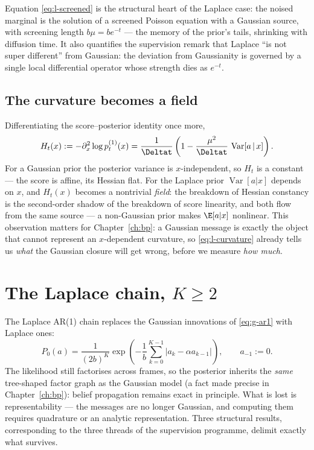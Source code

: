 Equation \eqref{eq:l-screened} is the structural heart of the Laplace case:
the noised marginal is the solution of a screened Poisson equation with a
Gaussian source, with screening length $b\mu = b e^{-t}$ --- the memory of
the prior's tails, shrinking with diffusion time. It also quantifies the
supervision remark that Laplace ``is not super different'' from Gaussian:
the deviation from Gaussianity is governed by a single local differential
operator whose strength dies as $e^{-t}$.

\subsection{The curvature becomes a field}

Differentiating the score--posterior identity once more,
\begin{equation}
  H_t(x) := -\partial_x^2 \log p_t^{(1)}(x)
  = \frac{1}{\Deltat}
    \left( 1 - \frac{\mu^2}{\Deltat}\, \operatorname{Var}[a \,|\, x] \right).
  \label{eq:l-curvature}
\end{equation}
For a Gaussian prior the posterior variance is $x$-independent, so $H_t$ is
a constant --- the score is affine, its Hessian flat. For the Laplace prior
$\operatorname{Var}[a|x]$ depends on $x$, and $H_t(x)$ becomes a nontrivial
\emph{field}: the breakdown of Hessian constancy is the second-order shadow
of the breakdown of score linearity, and both flow from the same source ---
a non-Gaussian prior makes $\E[a|x]$ nonlinear. This observation matters
for Chapter~\ref{ch:bp}: a Gaussian message is exactly the object that
cannot represent an $x$-dependent curvature, so \eqref{eq:l-curvature}
already tells us \emph{what} the Gaussian closure will get wrong, before we
measure \emph{how much}.

\section{The Laplace chain, $K \geq 2$}\label{sec:l-chain}

The Laplace AR(1) chain replaces the Gaussian innovations of
\eqref{eq:g-ar1} with Laplace ones:
\begin{equation}
  P_0(a) = \frac{1}{(2b)^K}
  \exp\!\left( -\frac{1}{b} \sum_{k=0}^{K-1}
    \big| a_k - \alpha a_{k-1} \big| \right),
  \qquad a_{-1} := 0 .
  \label{eq:l-chain-prior}
\end{equation}
The likelihood still factorises across frames, so the posterior inherits
the \emph{same} tree-shaped factor graph as the Gaussian model (a fact
made precise in Chapter~\ref{ch:bp}): belief propagation remains exact in
principle. What is lost is representability --- the messages are no longer
Gaussian, and computing them requires quadrature or an analytic
representation. Three structural results, corresponding to the three
threads of the supervision programme, delimit exactly what survives.

